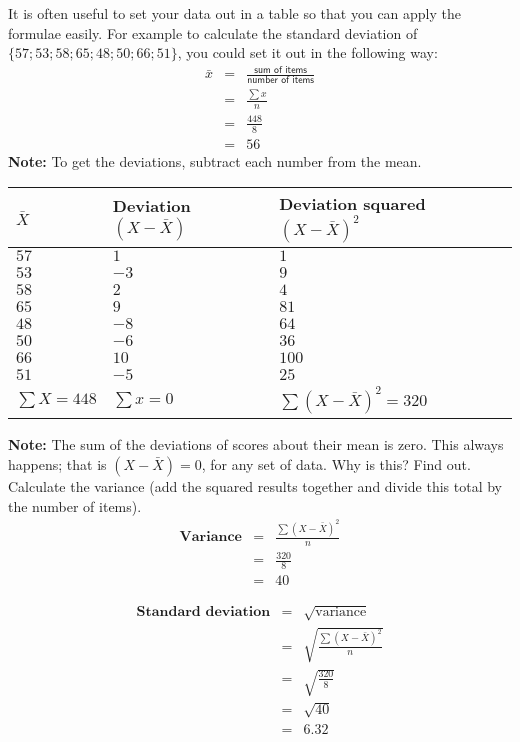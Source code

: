 It is often useful to set your data out in a table so that you can apply the formulae easily. For example to calculate the standard deviation of $\{57; 53; 58; 65; 48; 50; 66; 51\}$, you could set it out in the following way: \newline
\begin{eqnarray*}
\bar{x} & = & \frac{\textsf{sum of items}}{\textsf{number of items}} \\
&=& \frac{\sum {x}}{n} \\
&=& \frac{448}{8} \\
&=& 56
\end{eqnarray*}
\textbf{Note:} To get the deviations, subtract each number from the mean.
\begin{center}
\begin{tabular}{|l|l|l|}
\hline
\textbf{$\bar{X}$} & \textbf{Deviation $(X - \bar{X})$} & \textbf{Deviation squared $(X - \bar{X})^2$ } \\
\hline
$57$ & $1$ & $1$ \\
$53$ & $-3$ & $9$ \\
$58$ & $2$ & $4$ \\
$65$ & $9$ & $81$ \\
$48$ & $-8$ & $64$ \\
$50$ & $-6$ & $36$ \\
$66$ & $10$ & $100$ \\
$51$ & $-5$ & $25$ \\
\hline
$\sum{X} = 448$ & $\sum{x} = 0$ & $\sum{(X  - \bar{X})^2} = 320$ \\
\hline
\end{tabular}
\end{center}
\textbf{Note:} The sum of the deviations of scores about their mean is zero. This always happens; that is $(X - \bar{X}) = 0$, for any set of data. Why is this? Find out. \newline
Calculate the variance (add the squared results together and divide this total by the number of items).
\begin{eqnarray*}
\textbf{Variance} & = & \frac{\sum{(X - \bar{X})^2}}{n} \\
&=& \frac{320}{8} \\
&=& 40
\end{eqnarray*}

\begin{eqnarray*}
\textbf{Standard deviation} & = & \sqrt{\mbox{variance}} \\
&=& \sqrt{\frac{\sum{(X - \bar{X})^2}}{n}} \\
&=& \sqrt{\frac{320}{8}} \\
&=& \sqrt{40} \\
&=& 6.32 \\
\end{eqnarray*}

